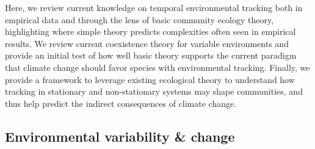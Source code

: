 \documentclass[11pt,letterpaper]{article}
\begin{document}
Here, we review current knowledge on temporal environmental tracking both in empirical data and through the lens of basic community ecology theory, highlighting where simple theory predicts complexities often seen in empirical results. We review current coexistence theory for variable environments and provide an initial test of how well basic theory supports the current paradigm that climate change should favor species with environmental tracking. Finally, we provide a framework to leverage existing ecological theory to understand how tracking in stationary and non-stationary systems may shape communities, and thus help predict the indirect consequences of climate change. 

\subsection{Environmental variability \& change}
\end{document}
